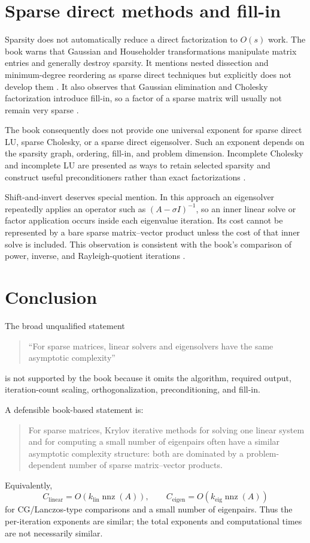 \documentclass[11pt,a4paper]{article}
\newcommand{\nnz}{\operatorname{nnz}}
\begin{document}
\section{Sparse direct methods and fill-in}

Sparsity does not automatically reduce a direct factorization to $O(s)$ work.
The book warns that Gaussian and Householder transformations manipulate matrix
entries and generally destroy sparsity.  It mentions nested dissection and
minimum-degree reordering as sparse direct techniques but explicitly does not
develop them \cite[p.~245]{trefethenbau}.  It also observes that Gaussian
elimination and Cholesky factorization introduce fill-in, so a factor of a
sparse matrix will usually not remain very sparse
\cite[p.~316]{trefethenbau}.

The book consequently does not provide one universal exponent for sparse
direct LU, sparse Cholesky, or a sparse direct eigensolver.  Such an exponent
depends on the sparsity graph, ordering, fill-in, and problem dimension.
Incomplete Cholesky and incomplete LU are presented as ways to retain selected
sparsity and construct useful preconditioners rather than exact factorizations
\cite[p.~316]{trefethenbau}.

Shift-and-invert deserves special mention.  In this approach an eigensolver
repeatedly applies an operator such as $(A-\sigma I)^{-1}$, so an inner linear
solve or factor application occurs inside each eigenvalue iteration.  Its cost
cannot be represented by a bare sparse matrix--vector product unless the cost
of that inner solve is included.  This observation is consistent with the
book's comparison of power, inverse, and Rayleigh-quotient iterations
\cite[p.~209]{trefethenbau}.

\section{Conclusion}

The broad unqualified statement
\begin{quote}
``For sparse matrices, linear solvers and eigensolvers have the same
asymptotic complexity''
\end{quote}
is not supported by the book because it omits the algorithm, required output,
iteration-count scaling, orthogonalization, preconditioning, and fill-in.

A defensible book-based statement is:
\begin{quote}
For sparse matrices, Krylov iterative methods for solving one linear system
and for computing a small number of eigenpairs often have a similar
asymptotic complexity structure: both are dominated by a problem-dependent
number of sparse matrix--vector products.
\end{quote}
Equivalently,
\begin{equation}
  \boxed{
  C_{\mathrm{linear}}=O(k_{\mathrm{lin}}\nnz(A)),\qquad
  C_{\mathrm{eigen}}=O(k_{\mathrm{eig}}\nnz(A))
  }
\end{equation}
for CG/Lanczos-type comparisons and a small number of eigenpairs.  Thus the
per-iteration exponents are similar; the total exponents and computational
times are not necessarily similar.
\end{document}
